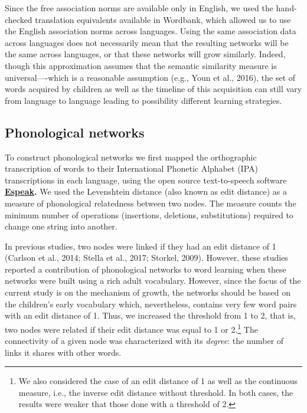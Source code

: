 \documentclass[english,floatsintext,man]{apa6}
\theoremstyle{definition}
\theoremstyle{definition}
\theoremstyle{definition}
\theoremstyle{remark}
\begin{document}
Since the free association norms are available only in English, we used
the hand-checked translation equivalents available in Wordbank, which
allowed us to use the English association norms across languages. Using
the same association data across languages does not necessarily mean
that the resulting networks will be the same across languages, or that
these networks will grow similarly. Indeed, though this approximation
assumes that the semantic similarity measure is universal----which is a
reasonable assumption (e.g., Youn et al., 2016), the set of words
acquired by children as well as the timeline of this acquisition can
still vary from language to language leading to possibility different
learning strategies.

\subsection{Phonological networks}\label{phonological-networks}

To construct phonological networks we first mapped the orthographic
transcription of words to their International Phonetic Alphabet (IPA)
transcriptions in each language, using the open source text-to-speech
software \textbf{\href{http://http://espeak.sourceforge.net/}{Espeak}.}
We used the Levenshtein distance (also known as edit distance) as a
measure of phonological relatedness between two nodes. The measure
counts the minimum number of operations (insertions, deletions,
substitutions) required to change one string into another.

In previous studies, two nodes were linked if they had an edit distance
of 1 (Carlson et al., 2014; Stella et al., 2017; Storkel, 2009).
However, these studies reported a contribution of phonological networks
to word learning when these networks were built using a rich adult
vocabulary. However, since the focus of the current study is on the
mechanism of growth, the networks should be based on the children's
early vocabulary which, nevertheless, contains very few word pairs with
an edit distance of 1. Thus, we increased the threshold from 1 to 2,
that is, two nodes were related if their edit distance was equal to 1 or
2.\footnote{We also considered the case of an edit distance of 1 as well as the continuous measure, i.e., the inverse edit distance without threshold. In both cases, the results were weaker that those done with a threshold of 2.}
The connectivity of a given node was characterized with its
\emph{degree}: the number of links it shares with other words.
\end{document}
